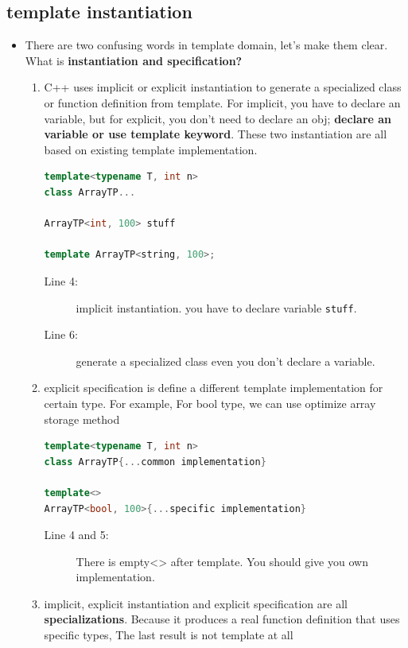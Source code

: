 \documentclass[a4paper,11pt,twoside]{book}
\begin{document}
\subsection{template instantiation}
\begin{itemize}
\item There are two confusing words in template domain, let's make them clear. What is \textbf{instantiation and specification?}
\begin{enumerate}
	\item C++ uses implicit or explicit instantiation to generate a specialized class or function definition from template. For implicit, you have to declare an variable, but for explicit, you don't need to declare an obj; \textbf{declare an variable or use template keyword}. These two instantiation are all based on existing template implementation.
	
\begin{lstlisting}[frame=single, language=c++]
template<typename T, int n>
class ArrayTP...
	
ArrayTP<int, 100> stuff 
	
template ArrayTP<string, 100>;
\end{lstlisting}
\begin{description}
	\item[Line 4:] implicit instantiation. you have to declare variable \texttt{stuff}.
	\item[Line 6:] generate a specialized class even you don't declare a variable.
\end{description}

	\item explicit specification is define a different template implementation for certain type. For example, For bool type, we can use optimize array storage method
\begin{lstlisting}[frame=single, language=c++]
template<typename T, int n>
class ArrayTP{...common implementation}
	
template<>
ArrayTP<bool, 100>{...specific implementation}
\end{lstlisting}
\begin{description}
	\item[Line 4 and 5:] There is empty<> after template. You should give you own implementation.
\end{description}
	
	\item implicit, explicit instantiation and explicit specification are all \textbf{specializations}. Because it produces a real function definition that uses specific types, The last result is not template at all 
	

\end{enumerate}
\end{itemize}
\end{document}
